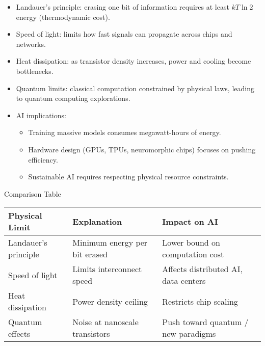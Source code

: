 \documentclass[
  letterpaper,
  DIV=11,
  numbers=noendperiod]{scrreprt}
\providecommand{\tightlist}{%
  \setlength{\itemsep}{0pt}\setlength{\parskip}{0pt}}
\begin{document}
\begin{itemize}
\item
  Landauer's principle: erasing one bit of information requires at least
  \(kT \ln 2\) energy (thermodynamic cost).
\item
  Speed of light: limits how fast signals can propagate across chips and
  networks.
\item
  Heat dissipation: as transistor density increases, power and cooling
  become bottlenecks.
\item
  Quantum limits: classical computation constrained by physical laws,
  leading to quantum computing explorations.
\item
  AI implications:

  \begin{itemize}
  \tightlist
  \item
    Training massive models consumes megawatt-hours of energy.
  \item
    Hardware design (GPUs, TPUs, neuromorphic chips) focuses on pushing
    efficiency.
  \item
    Sustainable AI requires respecting physical resource constraints.
  \end{itemize}
\end{itemize}

Comparison Table

\begin{longtable}[]{@{}
  >{\raggedright\arraybackslash}p{}
  >{\raggedright\arraybackslash}p{}
  >{\raggedright\arraybackslash}p{}@{}}
\toprule\noalign{}
\begin{minipage}[b]{\linewidth}\raggedright
Physical Limit
\end{minipage} & \begin{minipage}[b]{\linewidth}\raggedright
Explanation
\end{minipage} & \begin{minipage}[b]{\linewidth}\raggedright
Impact on AI
\end{minipage} \\
\midrule\noalign{}
\endhead
\bottomrule\noalign{}
\endlastfoot
Landauer's principle & Minimum energy per bit erased & Lower bound on
computation cost \\
Speed of light & Limits interconnect speed & Affects distributed AI,
data centers \\
Heat dissipation & Power density ceiling & Restricts chip scaling \\
Quantum effects & Noise at nanoscale transistors & Push toward quantum /
new paradigms \\
\end{longtable}
\end{document}
